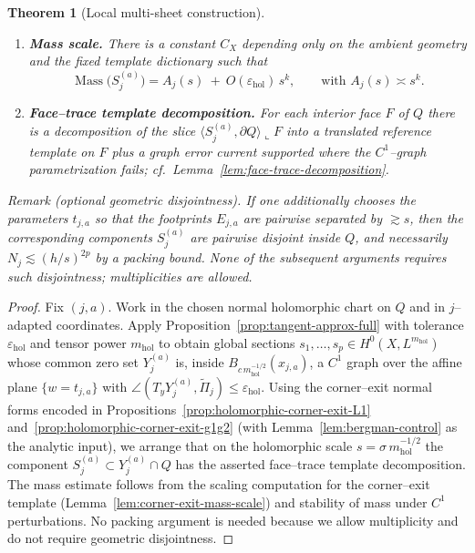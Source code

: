 \documentclass[11pt]{article}
\numberwithin{equation}{section}  %
\theoremstyle{plain}
\newtheorem{theorem}{Theorem}[section]
\theoremstyle{definition}
\theoremstyle{remark}
\newcommand{\mhol}{m_{\mathrm{hol}}} %
\DeclareMathOperator{\Mass}{Mass}
\begin{document}
\begin{theorem}[Local multi-sheet construction]
\begin{enumerate}
\item \textbf{Mass scale.}
There is a constant $C_X$ depending only on the ambient geometry and the fixed template dictionary such that
\[
\Mass\bigl(S_{j}^{(a)}\bigr)=A_j(s)\ +\ O(\varepsilon_{\mathrm{hol}})\,s^{k},
\qquad\text{with }A_j(s)\asymp s^{k}.
\]

\item \textbf{Face--trace template decomposition.}
For each interior face $F$ of $Q$ there is a decomposition of the slice
$\langle S_{j}^{(a)},\partial Q\rangle\llcorner F$ into a translated reference template on $F$ plus a graph error
current supported where the $C^1$--graph parametrization fails; cf.\ Lemma~\ref{lem:face-trace-decomposition}.
\end{enumerate}

Remark (optional geometric disjointness).
If one additionally chooses the parameters $t_{j,a}$ so that the footprints $E_{j,a}$ are
pairwise separated by $\gtrsim s$, then the corresponding components $S_{j}^{(a)}$ are pairwise disjoint inside $Q$,
and necessarily $N_j\lesssim (h/s)^{2p}$ by a packing bound.  None of the subsequent arguments requires such
disjointness; multiplicities are allowed.
\end{theorem}

\begin{proof}
Fix $(j,a)$.
Work in the chosen normal holomorphic chart on $Q$ and in $j$--adapted coordinates.
Apply Proposition~\ref{prop:tangent-approx-full} with tolerance $\varepsilon_{\mathrm{hol}}$ and tensor power $\mhol$
to obtain global sections $s_1,\dots,s_p\in H^0(X,L^{\mhol})$ whose common zero set $Y_{j}^{(a)}$ is, inside
$B_{c\,\mhol^{-1/2}}(x_{j,a})$, a $C^1$ graph over the affine plane $\{w=t_{j,a}\}$ with
$\angle(T_yY_{j}^{(a)},\widetilde\Pi_j)\le\varepsilon_{\mathrm{hol}}$.
Using the corner--exit normal forms encoded in Propositions~\ref{prop:holomorphic-corner-exit-L1}
and~\ref{prop:holomorphic-corner-exit-g1g2} (with Lemma~\ref{lem:bergman-control} as the analytic input),
we arrange that on the holomorphic scale $s=\sigma\,\mhol^{-1/2}$ the component $S_{j}^{(a)}\subset Y_{j}^{(a)}\cap Q$
has the asserted face--trace template decomposition.
The mass estimate follows from the scaling computation for the corner--exit template
(Lemma~\ref{lem:corner-exit-mass-scale}) and stability of mass under $C^1$ perturbations.
No packing argument is needed because we allow multiplicity and do not require geometric disjointness.
\end{proof}
\end{document}
